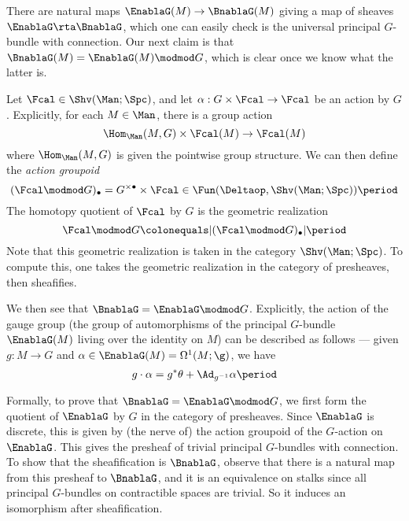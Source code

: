 There are natural maps $\EnablaG(M) \to \BnablaG(M)$ giving a map of sheaves $\EnablaG\rta\BnablaG$, which one can easily check is the universal principal $G$-bundle with connection. 
Our next claim is that $\BnablaG(M) = \EnablaG(M) \modmod G$, which is clear once we know what the latter is.

\begin{definition}
  Let $\Fcal \in \Shv(\Man;\Spc)$, and let $\alpha : G \times \Fcal \to \Fcal$ be an action by $G$. Explicitly, for each $M \in \Man$, there is a group action
  \begin{equation*}
    \Hom_{\Man}(M, G) \times \Fcal(M) \to \Fcal(M)
  \end{equation*}
  where $\Hom_{\Man}(M, G)$ is given the pointwise group structure. We can then define the \emph{action groupoid}
  \begin{equation*}
    (\Fcal\modmod G)_\bullet = G^{\times \bullet} \times \Fcal \in \Fun(\Deltaop,\Shv(\Man;\Spc)) \period
  \end{equation*} 
  The homotopy quotient of $\Fcal$ by $G$ is the geometric realization
  \begin{equation*}
    \Fcal\modmod G \colonequals |(\Fcal\modmod G)_\bullet| \period
  \end{equation*}
  Note that this geometric realization is taken in the category $\Shv(\Man;\Spc)$. 
  To compute this, one takes the geometric realization in the category of presheaves, then sheafifies.
\end{definition}

We then see that $\BnablaG = \EnablaG \modmod G$. Explicitly, the action of the gauge group (the group of automorphisms of the principal $G$-bundle $\EnablaG(M)$ living over the identity on $M$) can be described as follows --- given $g: M \to G$ and $\alpha \in \EnablaG(M) = \Omega^1(M;\g)$, we have
\begin{equation*}
  g \cdot \alpha = g^* \theta + \Ad_{g^{-1}} \alpha \period
\end{equation*}

\begin{remark}
  Formally, to prove that $\BnablaG = \EnablaG \modmod G$, we first form the quotient of $\EnablaG$ by $G$ in the category of presheaves. Since $\EnablaG$ is discrete, this is given by (the nerve of) the action groupoid of the $G$-action on $\EnablaG$. This gives the presheaf of trivial principal $G$-bundles with connection. To show that the sheafification is $\BnablaG$, observe that there is a natural map from this presheaf to $\BnablaG$, and it is an equivalence on stalks since all principal $G$-bundles on contractible spaces are trivial. So it induces an isomorphism after sheafification.
\end{remark}

